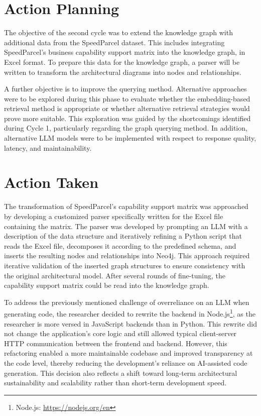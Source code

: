 \section{Action Planning}
\label{sec:cycle2_planning}
The objective of the second cycle was to extend the knowledge graph with additional data from the SpeedParcel dataset. This includes integrating SpeedParcel's business capability support matrix into the knowledge graph, in Excel format. To prepare this data for the knowledge graph, a parser will be written to transform the architectural diagrams into nodes and relationships.

A further objective is to improve the querying method. Alternative approaches were to be explored during this phase to evaluate whether the embedding-based retrieval method is appropriate or whether alternative retrieval strategies would prove more suitable. This exploration was guided by the shortcomings identified during Cycle 1, particularly regarding the graph querying method. In addition, alternative LLM models were to be implemented with respect to response quality, latency, and maintainability.

\section{Action Taken}
\label{sec:cycle2_actionTaken}
The transformation of SpeedParcel's capability support matrix was approached by developing a customized parser specifically written for the Excel file containing the matrix. The parser was developed by prompting an LLM with a description of the data structure and iteratively refining a Python script that reads the Excel file, decomposes it according to the predefined schema, and inserts the resulting nodes and relationships into Neo4j. This approach required iterative validation of the inserted graph structures to ensure consistency with the original architectural model. After several rounds of fine-tuning, the capability support matrix could be read into the knowledge graph.

To address the previously mentioned challenge of overreliance on an LLM when generating code, the researcher decided to rewrite the backend in Node.js\footnote{Node.js: \url{https://nodejs.org/en}}, as the researcher is more versed in JavaScript backends than in Python. This rewrite did not change the application's core logic and still allowed typical client-server HTTP communication between the frontend and backend. However, this refactoring enabled a more maintainable codebase and improved transparency at the code level, thereby reducing the development's reliance on AI-assisted code generation. This decision also reflects a shift toward long-term architectural sustainability and scalability rather than short-term development speed.

